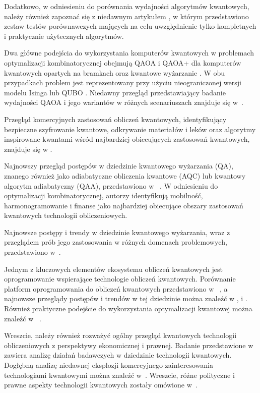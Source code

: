 \documentclass[a4paper,11pt]{article}
\begin{document}
Dodatkowo, w odniesieniu do porównania wydajności algorytmów kwantowych, należy również zapoznać się z niedawnym artykułem \cite{lubinski2023application}, w którym przedstawiono zestaw testów porównawczych mających na celu uwzględnienie tylko kompletnych i praktycznie użytecznych algorytmów.

Dwa główne podejścia do wykorzystania komputerów kwantowych w problemach optymalizacji kombinatorycznej obejmują QAOA \cite{farhi2014quantum} i QAOA+ \cite{hadfield2019quantum} dla komputerów kwantowych opartych na bramkach oraz kwantowe wyżarzanie \cite{canivell2021startup}. W obu przypadkach problem jest reprezentowany przy użyciu nieograniczonej wersji modelu Isinga \cite{lucas2014ising} lub QUBO \cite{glover2018tutorial}. Niedawny przegląd przedstawiający badanie wydajności QAOA i jego wariantów w różnych scenariuszach znajduje się w~\cite{blekos2023review}.

Przegląd komercyjnych zastosowań obliczeń kwantowych, identyfikujący bezpieczne szyfrowanie kwantowe, odkrywanie materiałów i leków oraz algorytmy inspirowane kwantami wśród najbardziej obiecujących zastosowań kwantowych, znajduje się w \cite{bova2021commercial}. 

Najnowszy przegląd postępów w dziedzinie kwantowego wyżarzania (QA), znanego również jako adiabatyczne obliczenia kwantowe (AQC) lub kwantowy algorytm adiabatyczny (QAA), przedstawiono w ~\cite{yarkoni2022quantum}. W odniesieniu do optymalizacji kombinatorycznej, autorzy identyfikują mobilność, harmonogramowanie i finanse jako najbardziej obiecujące obszary zastosowań kwantowych technologii obliczeniowych.

Najnowsze postępy i trendy w dziedzinie kwantowego wyżarzania, wraz z przeglądem prób jego zastosowania w różnych domenach problemowych, przedstawiono w~\cite{yulianti2022implementation}.

Jednym z kluczowych elementów ekosystemu obliczeń kwantowych jest oprogramowanie wspierające technologie obliczeń kwantowych. Porównanie platform oprogramowania do obliczeń kwantowych przedstawiono w ~\cite{larose2019overview}, a najnowsze przeglądy postępów i trendów w tej dziedzinie można znaleźć w \cite{zhao2020quantum}, \cite{gill2021quantum} i \cite{miszczak2023symbolic}. Również praktyczne podejście do wykorzystania optymalizacji kwantowej można znaleźć w ~\cite{combarro2023practical}.

Wreszcie, należy również rozważyć ogólny przegląd kwantowych technologii obliczeniowych z perspektywy ekonomicznej i prawnej.
Badanie przedstawione w \cite{seskir2021landscape} zawiera analizę działań badawczych w dziedzinie technologii kwantowych. Dogłębną analizę niedawnej eksplozji komercyjnego zainteresowania technologiami kwantowymi można znaleźć w~\cite{seskir2022landscape}. Wreszcie, różne polityczne i prawne aspekty technologii kwantowych zostały omówione w~\cite{hoofnagle2021law}. 
\end{document}
